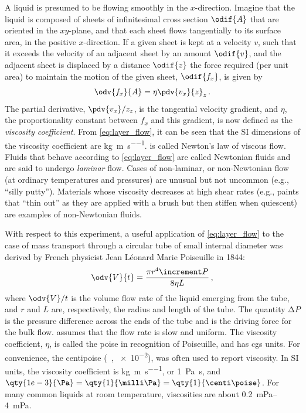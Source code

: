 A liquid is presumed to be flowing smoothly in the \( x \)-direction. 
Imagine that the liquid is composed of sheets of infinitesimal cross section \( \odif{A} \) that are oriented in the \( xy \)-plane, and that each sheet flows tangentially to its surface area, in the positive \( x \)-direction. 
If a given sheet is kept at a velocity \( v \), such that it exceeds the velocity of an adjacent sheet by an amount \( \odif{v} \), and the adjacent sheet is displaced by a distance \( \odif{z} \) the force required (per unit area) to maintain the motion of the given sheet, \( \odif{f_x} \), is given by
\begin{equation}
	\odv{f_x}{A} = \eta \pdv{v_x}{z}_{z} \, .
	\label{eq:layer_flow}
\end{equation}
The partial derivative, \( \pdv{v_x}/{z}_{z} \), is the tangential velocity gradient, and \( \eta \), the proportionality constant between \( f_x \) and this gradient, is now defined as the \emph{viscosity coefficient}. 
From \cref{eq:layer_flow}, it can be seen that the SI dimensions of the viscosity coefficient are \unit{\kg \per \m \per \s}.  is called Newton's law of viscous flow. 
Fluids that behave according to \cref{eq:layer_flow} are called Newtonian fluids and are said to undergo \emph{laminar} flow. 
Cases of non-laminar, or non-Newtonian flow (at ordinary temperatures and pressures) are unusual but not uncommon (e.g., ``silly putty'').
Materials whose viscosity decreases at high shear rates (e.g., paints that ``thin out'' as they are applied with a brush but then stiffen when quiescent) are examples of non-Newtonian fluids.

With respect to this experiment, a useful application of \cref{eq:layer_flow} to the case of mass transport through a circular tube of small internal diameter was derived by French physicist Jean Léonard Marie Poiseuille in 1844:
\begin{equation}
	\odv{V}{t} = \frac{\pi r^4 \increment P}{8 \eta L} \, ,
	\label{eq:tube_flow}
\end{equation}
where \( \odv{V}/{t} \) is the volume flow rate of the liquid emerging from the tube, and \( r \) and \( L \) are, respectively, the radius and length of the tube.
The quantity \( \increment P \) is the pressure difference across the ends of the tube and is the driving force for the bulk flow. 
 assumes that the flow rate is slow and uniform. 
The viscosity coefficient, \( \eta \), is called the poise in recognition of Poiseuille, and has cgs units.
For convenience, the centipoise (\unit{\centi\poise}, \qty{e-2}{\poise}), was often used to report viscosity. 
In SI units, the viscosity coefficient is \unit{\kg \per\m \per\s}, or \qty{1}{\Pa \s}, and \( \qty{1e-3}{\Pa} = \qty{1}{\milli\Pa} = \qty{1}{\centi\poise} \).
For many common liquids at room temperature, viscosities are about \SIrange{0.2}{4}{\milli\Pa}. 


